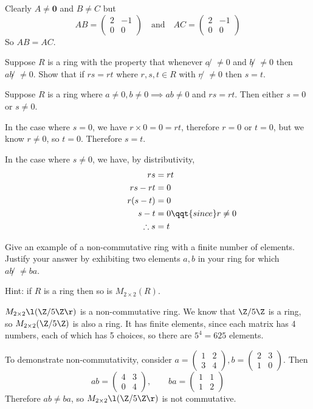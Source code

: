 \documentclass[a4paper]{article}
\begin{document}
Clearly $A \ne \mathbf 0$ and $B \ne C$ but \[
AB = \begin{pmatrix}2 & -1 \\ 0 & 0\end{pmatrix}
\quad \text{and} \quad
AC = \begin{pmatrix}2 & -1 \\ 0 & 0\end{pmatrix}
\] So $AB = AC$.


\begin{questionbody}
Suppose $R$ is a ring with the property that whenever $a̸ \ne 0$ and $b̸ \ne 0$ then $ab̸ \ne 0$. Show that if $rs = rt$ where $r, s, t \in R$ with $r̸ \ne 0$ then $s = t$.
\end{questionbody}

Suppose $R$ is a ring where $a \ne 0, b \ne 0 \implies ab \ne 0$ and $rs = rt$. Then either $s = 0$ or $s \ne 0$.

In the case where $s = 0$, we have $r \times 0 = 0 = rt$, therefore $r=0$ or $t=0$, but we know $r \ne 0$, so $t = 0$. Therefore $s=t$.

In the case where $s \ne 0$, we have, by distributivity, \begin{align*}
    rs &= rt \\
    \phantom{paddingpaddi} rs - rt &= 0 \\
    r (s - t) &= 0 \\
    s - t &= 0 \qqt{since } r \ne 0 \\
    \therefore s &= t
\end{align*}


\begin{questionbody}
Give an example of a non-commutative ring with a finite number of elements. Justify your answer by exhibiting two elements $a, b$ in your ring for which $ab̸ \ne ba$.

Hint: if $R$ is a ring then so is $M_{2 \times 2}(R)$.
\end{questionbody}

$M_{2 \times 2} \l( \Z / 5\Z \r)$ is a non-commutative ring. We know that $\Z / 5\Z$ is a ring, so $M_{2 \times 2}(\Z / 5 \Z)$ is also a ring. It has finite elements, since each matrix has 4 numbers, each of which has 5 choices, so there are $5^4 = 625$ elements.

To demonstrate non-commutativity, consider $a = \begin{pmatrix}1 & 2 \\ 3 & 4\end{pmatrix}, b = \begin{pmatrix}2 & 3 \\ 1 & 0\end{pmatrix}$. Then \[
ab = \begin{pmatrix}4 & 3 \\ 0 & 4\end{pmatrix},
\qquad ba = \begin{pmatrix}1 & 1 \\ 1 & 2\end{pmatrix}
\] Therefore $ab \ne ba$, so $M_{2 \times 2} \l( \Z / 5\Z \r)$ is not commutative.
\end{document}
